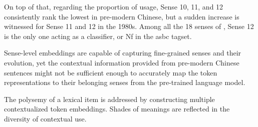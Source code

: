On top of that, regarding the proportion of usage, Sense 10, 11, and 12 consistently rank the lowest in pre-modern Chinese, but a sudden increase is witnessed for Sense 11 and 12 in the 1980s. Among all the 18 senses of \jia\rspace , Sense 12 is the only one acting as a classifier, or Nf in the \gls{asbc} tagset.

\begin{exe}
\end{exe}

Sense-level embeddings are capable of capturing fine-grained senses and their evolution, yet the contextual information provided from pre-modern Chinese sentences might not be sufficient enough to accurately map the token representations to their belonging senses from the pre-trained language model.


The polysemy of a lexical item is addressed by constructing multiple contextualized token embeddings. Shades of meanings are reflected in the diversity of contextual use.

